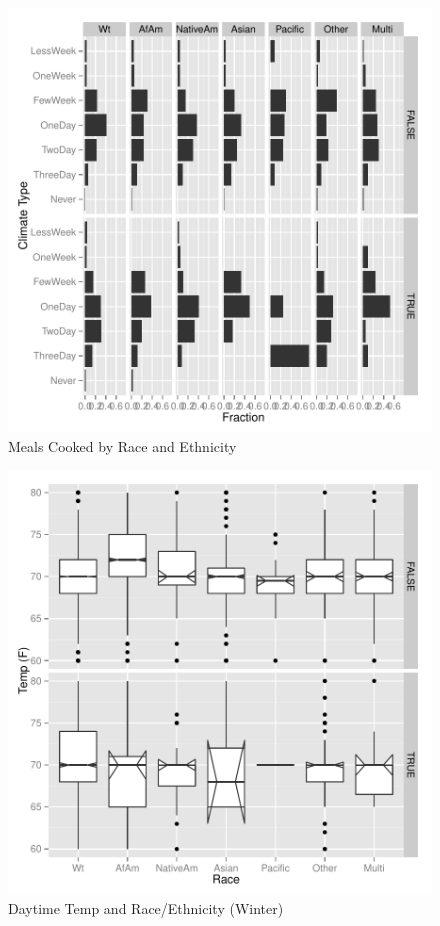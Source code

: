 \documentclass{article}
\begin{document}
\begin{figure}
\begin{center}
\caption{Meals Cooked by Race and Ethnicity}
\label{fig:Meals}
\includegraphics{DraftEdwardsWoods-011}
\end{center}
\end{figure}



\begin{figure}
\begin{center}
\caption{Daytime Temp and Race/Ethnicity (Winter)}
\label{fig:TempHomeRace}
\includegraphics{DraftEdwardsWoods-012}
\end{center}
\end{figure}
\end{document}
